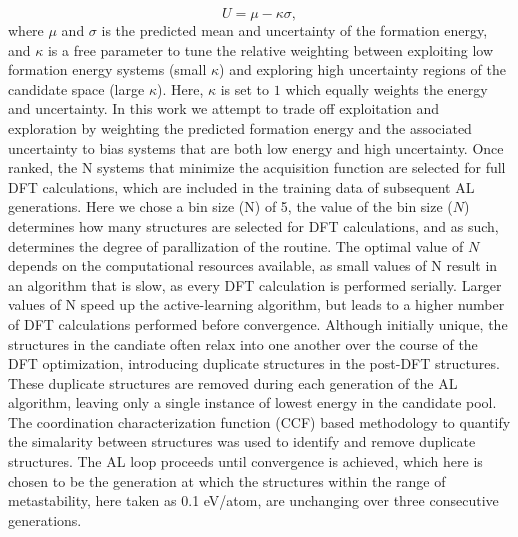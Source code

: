 \begin{equation}
    U = \mu - \kappa \sigma,
\end{equation}
%
where $\mu$ and $\sigma$ is the predicted mean and uncertainty of the formation energy,
and $\kappa$ is a free parameter to tune the relative weighting between exploiting low formation energy systems (small $\kappa$) and exploring high uncertainty regions of the candidate space (large $\kappa$).
%
Here, $\kappa$ is set to $1$ which equally weights the energy and uncertainty.
%
In this work we attempt to trade off exploitation and exploration by weighting the predicted formation energy and the associated uncertainty to bias systems that are both low energy and high uncertainty.
%
Once ranked, the N systems that minimize the acquisition function are selected for full DFT calculations, which are included in the training data of subsequent AL generations.
%
Here we chose a bin size (N) of 5, the value of the bin size ($N$) determines how many structures are selected for DFT calculations,
and as such, determines the degree of parallization of the routine.
%
The optimal value of $N$ depends on the computational resources available, as small values of N result in an algorithm that is slow, as every DFT calculation is performed serially.
%
Larger values of N speed up the active-learning algorithm, but leads to a higher number of DFT calculations performed before convergence.
%
Although initially unique, the structures in the candiate often relax into one another over the course of the DFT optimization, introducing duplicate structures in the post-DFT structures.
%
These duplicate structures are removed during each generation of the AL algorithm, leaving only a single instance of lowest energy in the candidate pool.
%
The coordination characterization function (CCF) based methodology to quantify the simalarity between structures was used to identify and remove duplicate structures.\cite{Su2017}
%
The AL loop proceeds until convergence is achieved, which here is chosen to be the generation at which the structures within the range of metastability, here taken as 0.1 eV/atom, are unchanging over three consecutive generations.



